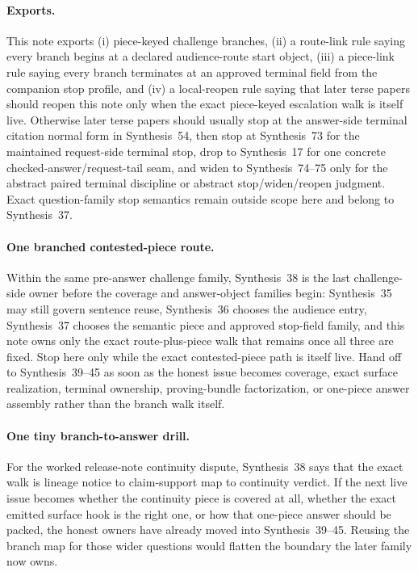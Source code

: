 \documentclass[11pt]{article}
\begin{document}
\paragraph{Exports.}
This note exports (i) piece-keyed challenge branches, (ii) a route-link rule saying every branch begins at a declared audience-route start object, (iii) a piece-link rule saying every branch terminates at an approved terminal field from the companion stop profile, and (iv) a local-reopen rule saying that later terse papers should reopen this note only when the exact piece-keyed escalation walk is itself live. Otherwise later terse papers should usually stop at the answer-side terminal citation normal form in Synthesis~54, then stop at Synthesis~73 for the maintained request-side terminal stop, drop to Synthesis~17 for one concrete checked-answer/request-tail seam, and widen to Synthesis~74--75 only for the abstract paired terminal discipline or abstract stop/widen/reopen judgment. Exact question-family stop semantics remain outside scope here and belong to Synthesis~37.\cite{series:challengestops,series:challengeanswerreviewmenus,series:publicrequestresponsepacketrefreshresponsepacketclosureverdicts,series:pairedterminalcitationdiscipline,series:pairedterminalcutoverrules,series:workedexample}

\paragraph{One branched contested-piece route.}
Within the same pre-answer challenge family, Synthesis~38 is the last challenge-side owner before the coverage and answer-object families begin: Synthesis~35 may still govern sentence reuse, Synthesis~36 chooses the audience entry, Synthesis~37 chooses the semantic piece and approved stop-field family, and this note owns only the exact route-plus-piece walk that remains once all three are fixed. Stop here only while the exact contested-piece path is itself live. Hand off to Synthesis~39--45 as soon as the honest issue becomes coverage, exact surface realization, terminal ownership, proving-bundle factorization, or one-piece answer assembly rather than the branch walk itself.

\paragraph{One tiny branch-to-answer drill.}
For the worked release-note continuity dispute, Synthesis~38 says that the exact walk is lineage notice to claim-support map to continuity verdict. If the next live issue becomes whether the continuity piece is covered at all, whether the exact emitted surface hook is the right one, or how that one-piece answer should be packed, the honest owners have already moved into Synthesis~39--45. Reusing the branch map for those wider questions would flatten the boundary the later family now owns.\cite{series:workedexample}
\end{document}
